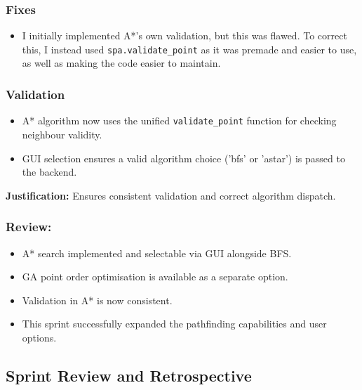 \subsubsection{Fixes}
\begin{itemize}
	\item I initially implemented A*'s own validation, but this was flawed. To correct this, I instead used \verb|spa.validate_point| as it was premade and easier to use, as well as making the code easier to maintain.
\end{itemize}

\subsubsection{Validation}
\begin{itemize}
	\item A* algorithm now uses the unified \verb|validate_point| function for checking neighbour validity.
	\item GUI selection ensures a valid algorithm choice ('bfs' or 'astar') is passed to the backend.
\end{itemize}
\textbf{Justification:} Ensures consistent validation and correct algorithm dispatch.

\subsubsection{Review:}
\begin{itemize}
	\item A* search implemented and selectable via GUI alongside BFS.
	\item GA point order optimisation is available as a separate option.
	\item Validation in A* is now consistent.
	\item This sprint successfully expanded the pathfinding capabilities and user options.
\end{itemize}

\clearpage
\subsection{Sprint Review and Retrospective}

